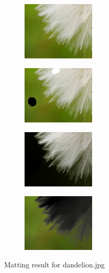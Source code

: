 \documentclass[11pt,letterpaper]{article}
\begin{document}
\begin{figure}[h!]
  \centering
  \begin{subfigure}{0.24\textwidth}
    \centering
    \includegraphics[width=3.5cm]{./result/dandelion/dandelion.jpg}
    \caption{}
  \end{subfigure}
  \begin{subfigure}{0.24\textwidth}
    \centering
    \includegraphics[width=3.5cm]{./result/dandelion/dandelion_m.jpg}
    \caption{}
  \end{subfigure}
  \begin{subfigure}{0.24\textwidth}
    \centering
    \includegraphics[width=3.5cm]{./result/dandelion/dandelion_foreground.png}
    \caption{}
  \end{subfigure}
  \begin{subfigure}{0.24\textwidth}
    \centering
    \includegraphics[width=3.5cm]{./result/dandelion/dandelion_background.png}
    \caption{}
  \end{subfigure}    
  \caption {Matting result for dandelion.jpg}
\end{figure}
\end{document}
